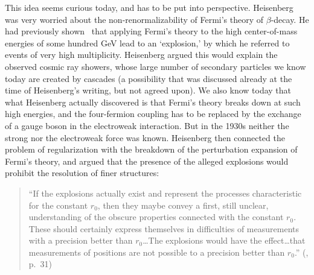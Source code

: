 \documentclass{article}
\begin{document}
This idea seems curious today, and has to be put into perspective. Heisenberg was
very worried about the non-renormalizability  of Fermi's theory of $\beta$-decay. He had previously
shown~\cite{Heisenberg2} that applying Fermi's theory to the high center-of-mass energies of some hundred GeV 
lead to an `explosion,'
by which he referred to events of very high multiplicity. Heisenberg argued this would explain the observed
cosmic ray showers, whose large number of secondary particles we know today are created by cascades (a possibility that was discussed already at the time of Heisenberg's writing, but
not agreed upon). We also know today that what Heisenberg actually discovered is that Fermi's theory
breaks down at such high energies, and the four-fermion coupling has to be replaced by the exchange
of a gauge boson in the electroweak interaction. But in the 1930s neither the strong nor the
electroweak force was known. Heisenberg then connected the problem of regularization with the
breakdown of the perturbation expansion of Fermi's theory, and argued that the presence
of the alleged explosions would prohibit the resolution of finer structures:
%
\begin{quote}
``If the explosions actually exist and represent the processes
  characteristic for the constant $r_0$, then they maybe convey a
  first, still unclear, understanding of the obscure properties
  connected with the constant $r_0$. These should certainly express
  themselves in difficulties of measurements with a precision better
  than $r_0$\ldots The explosions would have the effect\ldots that
  measurements of positions are not possible to a precision better
  than $r_0$.''%
  (\cite{Heisenberg1}, p.~31)
\end{quote}
\end{document}
